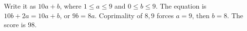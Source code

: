 Write it as $10a+b$, where $1\le a\le9$ and $0\le b\le9$. The equation is $10b+2a=10a+b$, or $9b=8a$. Coprimality of $8,9$ forces $a=9$, then $b=8$. The score is $\boxed{98}$.
